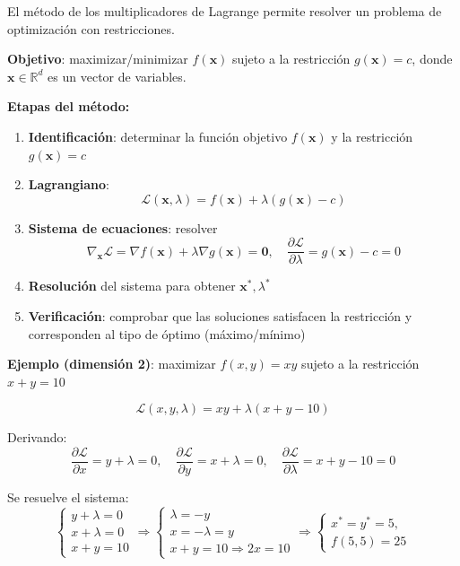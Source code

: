 \begin{f}
	
	El método de los multiplicadores de Lagrange permite resolver un problema de optimización con restricciones.
	
	\textbf{Objetivo}: maximizar/minimizar \(f(\boldsymbol{x})\) sujeto a la restricción \(g(\boldsymbol{x}) = c\), donde \(\boldsymbol{x} \in \mathbb{R}^d\) es un vector de variables.
	
	\textbf{Etapas del método:}
	\begin{enumerate}
		\item \textbf{Identificación}: determinar la función objetivo \(f(\boldsymbol{x})\) y la restricción \(g(\boldsymbol{x}) = c\)
		\item \textbf{Lagrangiano}:
		\[
		\mathcal{L}(\boldsymbol{x}, \lambda) = f(\boldsymbol{x}) + \lambda (g(\boldsymbol{x}) - c)
		\]
		\item \textbf{Sistema de ecuaciones}: resolver
		\[
		\nabla_{\boldsymbol{x}} \mathcal{L} = \nabla f(\boldsymbol{x}) + \lambda \nabla g(\boldsymbol{x}) = \boldsymbol{0}, \quad
		\frac{\partial \mathcal{L}}{\partial \lambda} = g(\boldsymbol{x}) - c = 0
		\]
		\item \textbf{Resolución} del sistema para obtener \(\boldsymbol{x}^*, \lambda^*\)
		\item \textbf{Verificación}: comprobar que las soluciones satisfacen la restricción y corresponden al tipo de óptimo (máximo/mínimo)
	\end{enumerate}
	
	\textbf{Ejemplo (dimensión 2)}: maximizar \(f(x, y) = xy\) sujeto a la restricción \(x + y = 10\)
	
	\[
	\mathcal{L}(x, y, \lambda) = xy + \lambda (x + y - 10)
	\]
	
	Derivando:
	\[
	\frac{\partial \mathcal{L}}{\partial x} = y + \lambda = 0, \quad
	\frac{\partial \mathcal{L}}{\partial y} = x + \lambda = 0, \quad
	\frac{\partial \mathcal{L}}{\partial \lambda} = x + y - 10 = 0
	\]
	
	Se resuelve el sistema:
	\[
	\begin{cases}
		y + \lambda = 0 \\
		x + \lambda = 0 \\
		x + y = 10
	\end{cases}
	\Rightarrow
	\begin{cases}
		\lambda = -y \\
		x = -\lambda = y \\
		x + y = 10 \Rightarrow 2x = 10
	\end{cases}
	\Rightarrow
	\begin{cases}
		x^* = y^* = 5,\\
		f(5,5) = 25
	\end{cases}
	\]
	

\end{f}
